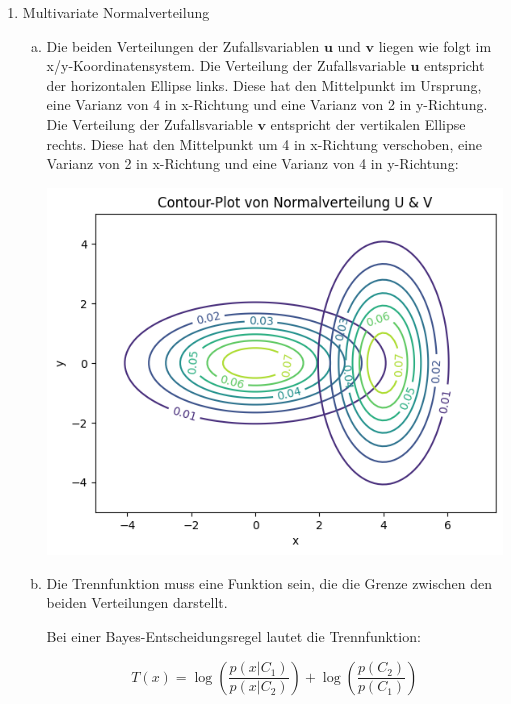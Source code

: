 \documentclass[a4paper,12pt]{article}
\begin{document}
\begin{enumerate}
{\begin{enumerate}[a)]
	\end{enumerate}

}

\item {Multivariate Normalverteilung

	\begin{enumerate}[a)]

		\item Die beiden Verteilungen der Zufallsvariablen $\mathbf{u}$ und $\mathbf{v}$ liegen wie folgt im x/y-Koordinatensystem.
		Die Verteilung der Zufallsvariable $\mathbf{u}$ entspricht der horizontalen Ellipse links. Diese hat den Mittelpunkt im Ursprung, eine Varianz von 4 in x-Richtung und eine Varianz von 2 in y-Richtung.
		Die Verteilung der Zufallsvariable $\mathbf{v}$ entspricht der vertikalen Ellipse rechts. Diese hat den Mittelpunkt um 4 in x-Richtung verschoben, eine Varianz von 2 in x-Richtung und eine Varianz von 4 in y-Richtung:
		
		\includegraphics{3a.png}

		\item 
		
		Die Trennfunktion muss eine Funktion sein, die die Grenze zwischen den beiden Verteilungen darstellt. 

		Bei einer Bayes-Entscheidungsregel lautet die Trennfunktion:

		\begin{equation}
			T(x) = \log\left(\frac{p(x|C_1)}{p(x|C_2)}\right) + \log\left(\frac{p(C_2)}{p(C_1)}\right)
		\end{equation}


\end{enumerate}}
\end{enumerate}
\end{document}
